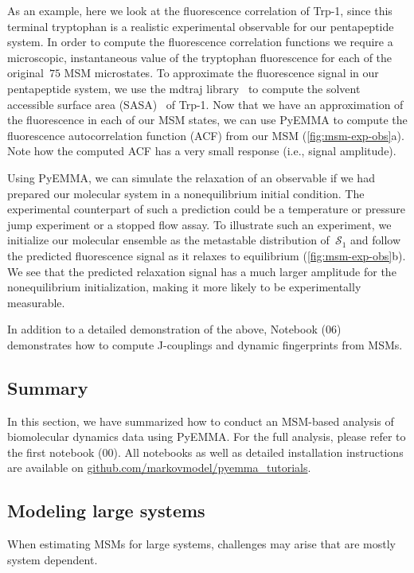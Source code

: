 \documentclass[9pt,tutorial]{livecoms}
\newcommand{\githubrepository}{\url{github.com/markovmodel/pyemma_tutorials}}
\begin{document}
As an example, here we look at the fluorescence correlation of Trp-1,
since this terminal tryptophan is a realistic experimental observable for our pentapeptide system.
In order to compute the fluorescence correlation functions we require a microscopic,
instantaneous value of the tryptophan fluorescence for each of the original~$75$ MSM microstates.
To approximate the fluorescence signal in our pentapeptide system,
we use the mdtraj library~\cite{mdtraj} to compute the solvent accessible surface area (SASA)~\cite{sasa-calculation} of Trp-1.
Now that we have an approximation of the fluorescence in each of our MSM states,
we can use PyEMMA to compute the fluorescence autocorrelation function (ACF) from our MSM (\ref{fig:msm-exp-obs}a).
Note how the computed ACF has a very small response (i.e., signal amplitude).

Using PyEMMA, we can simulate the relaxation of an observable if we had prepared our molecular system in a nonequilibrium initial condition.
The experimental counterpart of such a prediction could be a temperature or pressure jump experiment or a stopped flow assay.
To illustrate such an experiment, we initialize our molecular ensemble as the metastable distribution of~$\mathcal{S}_1$
and follow the predicted fluorescence signal as it relaxes to equilibrium (\ref{fig:msm-exp-obs}b).
We see that the predicted relaxation signal has a much larger amplitude for the nonequilibrium initialization,
making it more likely to be experimentally measurable.

In addition to a detailed demonstration of the above, Notebook (06) demonstrates how to compute J-couplings and dynamic fingerprints from MSMs.

\subsection{Summary}

In this section, we have summarized how to conduct an MSM-based analysis of biomolecular dynamics data using PyEMMA.
For the full analysis, please refer to the first notebook (00).
All notebooks as well as detailed installation instructions are available on \githubrepository{}.

\subsection{Modeling large systems}

When estimating MSMs for large systems, challenges may arise that are mostly system dependent.
\end{document}
